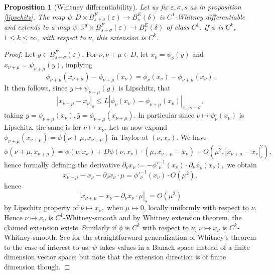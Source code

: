 \documentclass[oneside, 11pt]{amsbook}
\newcommand{\abs}[1]{{\left|#1\right|}}
\newcommand{\R}{\mathbb{R}}
\newcommand{\eps}{\varepsilon}
\newcommand{\0}{{(0)}}
\newcommand{\3}{{(3)}}
\newtheorem{prop}{Proposition}[section]
\numberwithin{equation}{section}
\numberwithin{defn}{section}
\numberwithin{prop}{section}
\numberwithin{cor}{section}
\numberwithin{lemma}{section}
\numberwithin{rmk}{section}
\numberwithin{corollary}{section}
\begin{document}
\begin{prop}[Whitney differentiability]Let us fix $\eps, \sigma, s$ as in proposition \ref{lipschitz}. The map $\psi : D\times B^{F}_{s+\sigma}(\eps)\to B^{E}_s(\delta)$ is $C^1$-Whitney differentiable and extends to a map $\psi : \R^{d}\times B^{F}_{s+\sigma}(\eps)\to B^{E}_s(\delta) $ of class $C^1$. If $\phi$ is $C^k$, $1\leq k\leq \infty$, with respect to $\nu$, this extension is $C^k$.
\label{Whitney}
\end{prop}

\begin{proof}
Let $y\in B^{F}_{s+\sigma}(\eps)$. For $\nu,\nu + \mu\in D$, let $x_\nu = \psi_{\nu}(y)$ and $x_{\nu + \mu}=\psi_{\nu+\mu}(y)$, implying \[\phi_{\nu+\mu}(x_{\nu+\mu}) - \phi_{\nu+\mu}(x_{\nu}) = \phi_{\nu}(x_\nu) - \phi_{\nu+\mu}(x_{\nu}).\] It then follows, since $y\mapsto\psi_{\nu+\mu}(y)$ is Lipschitz, that \[\abs{x_{\nu+\mu} - x_{\nu}}_s\leq L \abs{\phi_{\nu}(x_{\nu}) - \phi_{\nu+\mu}(x_{\nu})}_{x_{\nu},s+\sigma},\] taking ${y}=\phi_{\nu +\mu}(x_{\nu}),\hat{y}=\phi_{\nu+\mu}(x_{\nu+\mu}).$ In particular since $\nu\mapsto\phi_{\nu}(x_{\nu})$ is Lipschitz, the same is for $\nu\mapsto x_{\nu}.$
Let us now expand $\phi_{\nu+\mu}(x_{\nu+\mu})=\phi(\nu+\mu, x_{\nu+\mu})$ in Taylor at $(\nu,x_{\nu}).$ We have 
\[\phi(\nu+\mu,x_{\nu+\mu}) = \phi(\nu,x_{\nu}) + D\phi(\nu,x_{\nu})\cdot (\mu, x_{\nu+\mu} - x_{\nu}) + O(\mu^2, \abs{x_{\nu+\mu} - x_{\nu}}_s^2),\] hence formally defining the derivative $\partial_{\nu} x_{\nu} := - \phi'^{-1}_{\nu}(x_{\nu})\cdot\partial_{\nu} \phi_{\nu}(x_{\nu}),$ we obtain \[x_{\nu+\mu} - x_{\nu} - \partial_{\nu} x_{\nu}\cdot\mu = \phi'^{-1}_{\nu}(x_{\nu})\cdot O(\mu^2),\] hence \[\abs{x_{\nu+\mu} - x_{\nu} - \partial_{\nu} x_{\nu}\cdot\mu}_s = O(\mu^2)\] by Lipschitz property of $\nu\mapsto x_{\nu},$ when $\mu\mapsto 0$, locally uniformly with respect to $\nu$. Hence $\nu\mapsto x_{\nu}$ is $C^1$-Whitney-smooth and by Whitney extension theorem, the claimed extension exists. Similarly if $\phi$ is $C^k$ with respect to $\nu$, $\nu\mapsto x_{\nu}$ is $C^k$-Whitney-smooth. See \cite{Abraham-Robbin:1967} for the straightforward generalization of Whitney's theorem to the case of interest to us: $\psi$ takes values in a Banach space instead of a finite dimension vector space; but note that the extension direction is of finite dimension though.
\end{proof}
\end{document}
